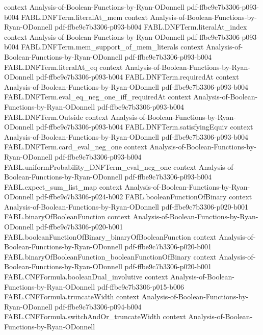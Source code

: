 \begin{theorem}
  {context}
  {Analysis-of-Boolean-Functions-by-Ryan-ODonnell}
  {pdf-ffbe9c7b3306-p093-b004}
\proofstep
  {FABL.DNFTerm.literalAt_mem}
  {context}
  {Analysis-of-Boolean-Functions-by-Ryan-ODonnell}
  {pdf-ffbe9c7b3306-p093-b004}
\proofstep
  {FABL.DNFTerm.literalAt_index}
  {context}
  {Analysis-of-Boolean-Functions-by-Ryan-ODonnell}
  {pdf-ffbe9c7b3306-p093-b004}
\proofstep
  {FABL.DNFTerm.mem_support_of_mem_literals}
  {context}
  {Analysis-of-Boolean-Functions-by-Ryan-ODonnell}
  {pdf-ffbe9c7b3306-p093-b004}
\proofstep
  {FABL.DNFTerm.literalAt_eq}
  {context}
  {Analysis-of-Boolean-Functions-by-Ryan-ODonnell}
  {pdf-ffbe9c7b3306-p093-b004}
\proofstep
  {FABL.DNFTerm.requiredAt}
  {context}
  {Analysis-of-Boolean-Functions-by-Ryan-ODonnell}
  {pdf-ffbe9c7b3306-p093-b004}
\proofstep
  {FABL.DNFTerm.eval_eq_neg_one_iff_requiredAt}
  {context}
  {Analysis-of-Boolean-Functions-by-Ryan-ODonnell}
  {pdf-ffbe9c7b3306-p093-b004}
\proofstep
  {FABL.DNFTerm.Outside}
  {context}
  {Analysis-of-Boolean-Functions-by-Ryan-ODonnell}
  {pdf-ffbe9c7b3306-p093-b004}
\proofstep
  {FABL.DNFTerm.satisfyingEquiv}
  {context}
  {Analysis-of-Boolean-Functions-by-Ryan-ODonnell}
  {pdf-ffbe9c7b3306-p093-b004}
\proofstep
  {FABL.DNFTerm.card_eval_neg_one}
  {context}
  {Analysis-of-Boolean-Functions-by-Ryan-ODonnell}
  {pdf-ffbe9c7b3306-p093-b004}
\proofstep
  {FABL.uniformProbability_DNFTerm_eval_neg_one}
  {context}
  {Analysis-of-Boolean-Functions-by-Ryan-ODonnell}
  {pdf-ffbe9c7b3306-p093-b004}
\proofstep
  {FABL.expect_sum_list_map}
  {context}
  {Analysis-of-Boolean-Functions-by-Ryan-ODonnell}
  {pdf-ffbe9c7b3306-p024-b002}
\proofstep
  {FABL.booleanFunctionOfBinary}
  {context}
  {Analysis-of-Boolean-Functions-by-Ryan-ODonnell}
  {pdf-ffbe9c7b3306-p020-b001}
\proofstep
  {FABL.binaryOfBooleanFunction}
  {context}
  {Analysis-of-Boolean-Functions-by-Ryan-ODonnell}
  {pdf-ffbe9c7b3306-p020-b001}
\proofstep
  {FABL.booleanFunctionOfBinary_binaryOfBooleanFunction}
  {context}
  {Analysis-of-Boolean-Functions-by-Ryan-ODonnell}
  {pdf-ffbe9c7b3306-p020-b001}
\proofstep
  {FABL.binaryOfBooleanFunction_booleanFunctionOfBinary}
  {context}
  {Analysis-of-Boolean-Functions-by-Ryan-ODonnell}
  {pdf-ffbe9c7b3306-p020-b001}
\proofstep
  {FABL.CNFFormula.booleanDual_involutive}
  {context}
  {Analysis-of-Boolean-Functions-by-Ryan-ODonnell}
  {pdf-ffbe9c7b3306-p015-b006}
\proofstep
  {FABL.CNFFormula.truncateWidth}
  {context}
  {Analysis-of-Boolean-Functions-by-Ryan-ODonnell}
  {pdf-ffbe9c7b3306-p094-b004}
\proofstep
  {FABL.CNFFormula.switchAndOr_truncateWidth}
  {context}
  {Analysis-of-Boolean-Functions-by-Ryan-ODonnell}

\end{theorem}
